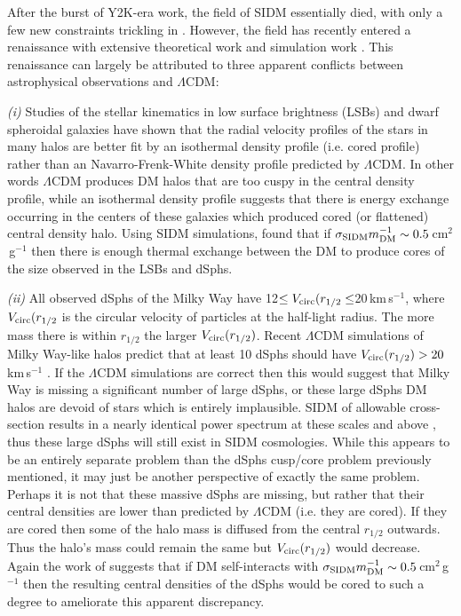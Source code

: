 After the burst of Y2K-era work, the field of SIDM essentially died, with only a few new constraints trickling in \citep{Randall:2008hs, Dawson:2012dl, Merten:2011gu}.
However, the field has recently entered a renaissance with extensive theoretical work \citep{ArkaniHamed:2009gk, Feng:2010kh, Tulin:2012jt, Tulin:2013eo, Ackerman:2009ia, Pospelov:2008di} and simulation work \citep{Peter:2012vi, Rocha:2012tr, Vogelsberger:2012dy, Vogelsberger:2013bb, Zavala:2013iq}.
This renaissance can largely be attributed to three apparent conflicts between astrophysical observations and $\Lambda$CDM:

{\it (i)} Studies of the stellar kinematics in low surface brightness (LSBs) and dwarf spheroidal galaxies \citep[dSphs;][]{Simon:2005fu, deNaray:2008iz, Oh:2011jd} have shown that the radial velocity profiles of the stars in many halos are better fit by an isothermal density profile (i.e. cored profile) rather than an Navarro-Frenk-White \citep[NFW;][]{Navarro:1996ce} density profile predicted by $\Lambda$CDM.
In other words $\Lambda$CDM produces DM halos that are too cuspy in the central density profile, while an isothermal density profile suggests that there is energy exchange occurring in the centers of these galaxies which produced cored (or flattened) central density halo.
Using SIDM simulations, \citet{Rocha:2012tr} found that if $\sigma_{\rm SIDM}m_{\rm DM}^{-1} \sim 0.5$\,cm$^2$\,g$^{-1}$ then there is enough thermal exchange between the DM to produce cores of the size observed in the LSBs and dSphs.

{\it (ii)} All observed dSphs of the Milky Way have 12$\leq V_{\rm circ}(r_{1/2} \leq$20\,km\,s$^{-1}$, where $V_{\rm circ}(r_{1/2}$ is the circular velocity of particles at the half-light radius.
The more mass there is within $r_{1/2}$ the larger $V_{\rm circ}(r_{1/2})$.  
Recent $\Lambda$CDM simulations of Milky Way-like halos predict that at least 10 dSphs should have $V_{\rm circ}(r_{1/2}) > 20$\,km\,s$^{-1}$ \citep{BoylanKolchin:2012id}.
If the $\Lambda$CDM simulations are correct then this would suggest that Milky Way is missing a significant number of large dSphs, or these large dSphs DM halos are devoid of stars which is entirely implausible.
SIDM of allowable cross-section results in a nearly identical power spectrum at these scales and above \citep{Rocha:2012tr}, thus these large dSphs will still exist in SIDM cosmologies.
While this appears to be an entirely separate problem than the dSphs cusp/core problem previously mentioned, it may just be another perspective of exactly the same problem.
Perhaps it is not that these massive dSphs are missing, but rather that their central densities are lower than predicted by $\Lambda$CDM (i.e. they are cored).
If they are cored then some of the halo mass is diffused from the central $r_{1/2}$ outwards.
Thus the halo's mass could remain the same but $V_{\rm circ}(r_{1/2})$ would decrease.
Again the work of \citet{Rocha:2012tr} suggests that if DM self-interacts with $\sigma_{\rm SIDM}m_{\rm DM}^{-1} \sim 0.5$\,cm$^2$\,g$^{-1}$ then the resulting central densities of the dSphs would be cored to such a degree to ameliorate this apparent discrepancy. 

